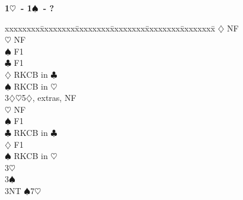 \documentclass[10pt]{article}
\renewcommand{\c}{$\clubsuit$}
\renewcommand{\d}{$\diamondsuit$}
\newcommand{\h}{$\heartsuit$}
\newcommand{\s}{$\spadesuit$}
\newenvironment{bidtable}[1][]
{\textbf{#1}
  \begin{adjustwidth}{1em}{}
    \addvspace{2pt}
    \begin{tabbing}
      xxxxxxxx\=xxxxxxxx\=xxxxxxxx\=xxxxxxxx\=xxxxxxxx\=xxxxxxxx\=\kill}
{\end{tabbing}\end{adjustwidth}\bigskip}%
\begin{document}
\begin{multicols*}{2}
\begin{bidtable}[1\h\ - 1\s\ - ?]
    \d  \> NF                                   \\
    \h  \> NF                                   \\
    \s  \> F1                                   \\
    \c  \> F1                                   \\
    \d  \> RKCB in \c                           \\
    \s  \> RKCB in \h                           \\
3\d {}\h 5\d, extras, NF                          \\
    \h  \> NF                                   \\
    \s  \> F1                                   \\
    \c  \> RKCB in \c                           \\
    \d  \> F1                                   \\
    \s  \> RKCB in \h                           \\
3\h \>                                              \\
3\s \>                                              \\
3NT \s7\h                                       \\
\end{bidtable}


\end{multicols*}
\end{document}
